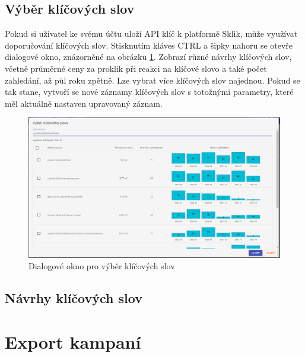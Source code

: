 \subsection{Výběr klíčových slov}
Pokud si uživatel ke svému účtu uloží API klíč k platformě Sklik, může využívat doporučování klíčových slov. Stisknutím kláves CTRL a šipky nahoru se otevře dialogové okno,
znázorněné na obrázku \ref{fig:keyword-dialog}. Zobrazí různé návrhy klíčových slov, včetně průměrné ceny za proklik při reakci na klíčové slovo a také počet zahledání, až půl roku zpětně.
Lze vybrat více klíčových slov najednou. Pokud se tak stane, vytvoří se nové záznamy klíčových slov s totožnými parametry, které měl aktuálně nastaven upravovaný záznam.  

\begin{figure}[h]
    \centering
    \includegraphics[width=1\textwidth]{Figures/ui/keyword-dialog.png}
    \caption{Dialogové okno pro výběr klíčových slov}
    \label{fig:keyword-dialog}
\end{figure}


\subsection{Návrhy klíčových slov}

\section{Export kampaní}


\endinput